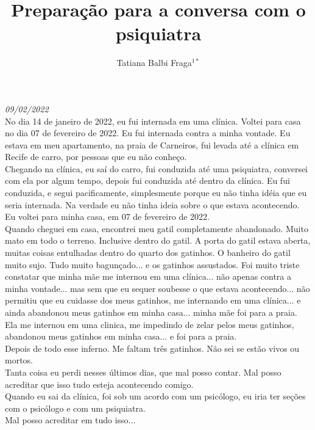 \documentclass{book}
\title{Preparação para a conversa com o psiquiatra}
\author{Tatiana Balbi Fraga$^{1*}$}
\begin{document}
\emph{09/02/2022}  \\

No dia 14 de janeiro de 2022, eu fui internada em uma clínica. Voltei para casa no dia 07 de fevereiro de 2022. Eu fui internada contra a minha vontade. Eu estava em meu apartamento, na praia de Carneiros, fui levada até a clínica em Recife de carro, por pessoas que eu não conheço. \\

Chegando na clínica, eu saí do carro, fui conduzida até uma psiquiatra, conversei com ela por algum tempo, depois fui conduzida até dentro da clínica. Eu fui conduzida, e segui pacificamente, simplesmente porque eu não tinha idéia que eu seria internada. Na verdade eu não tinha ideia sobre o que estava acontecendo. \\

Eu voltei para minha casa, em 07 de fevereiro de 2022. \\

Quando cheguei em casa, encontrei meu gatil completamente abandonado. Muito mato em todo o terreno. Inclusive dentro do gatil. A porta do gatil estava aberta, muitas coisas entulhadas dentro do quarto dos gatinhos. O banheiro do gatil muito sujo. Tudo muito bagunçado... e os gatinhos assustados. Foi muito triste constatar que minha mãe me internou em uma clínica... não apenas contra a minha vontade... mas sem que eu sequer soubesse o que estava acontecendo... não permitiu que eu cuidasse dos meus gatinhos, me internando em uma clínica... e ainda abandonou meus gatinhos em minha casa... minha mãe foi para a praia. \\

Ela me internou em uma clinica, me impedindo de zelar pelos meus gatinhos, abandonou meus gatinhos em minha casa... e foi para a praia.\\

Depois de todo esse inferno. Me faltam três gatinhos. Não sei se estão vivos ou mortos. \\

Tanta coisa eu perdi nesses últimos dias, que mal posso contar. Mal posso acreditar que isso tudo esteja acontecendo comigo. \\

Quando eu sai da clínica, foi sob um acordo com um psicólogo, eu iria ter seções com o psicólogo e com um psiquiatra.\\

Mal posso acreditar em tudo isso... \\
\end{document}
